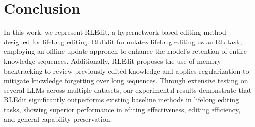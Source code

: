 \section{Conclusion}
In this work, we represent RLEdit, a hypernetwork-based editing method designed for lifelong editing. RLEdit formulates lifelong editing as an RL task, employing an offline update approach to enhance the model's retention of entire knowledge sequences. Additionally, RLEdit proposes the use of memory backtracking to review previously edited knowledge and applies regularization to mitigate knowledge forgetting over long sequences. Through extensive testing on several LLMs across multiple datasets, our experimental results demonstrate that RLEdit significantly outperforms existing baseline methods in lifelong editing tasks, showing superior performance in editing effectiveness, editing efficiency, and general capability preservation.